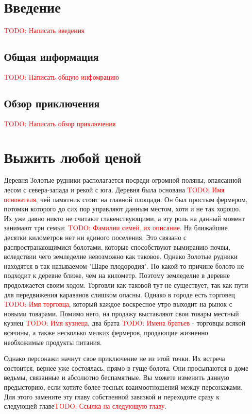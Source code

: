 \documentclass[10pt,a4paper]{book}
\newcommand{\TODO}[1]{\textcolor{red}{TODO: #1}}
\begin{document}
	\chapter{Введение}
		\TODO{Написать введения}
		\section{Общая информация}
			\TODO{Написать общую инфомрацию}
		\section{Обзор приключения}
			\TODO{Написать обзор приключения}
	
	\chapter{Выжить любой ценой}
		Деревня Золотые рудники располагается посреди огромной поляны, опаясанной лесом с севера-запада и рекой с юга. Деревня была основана \TODO{Имя основателя}, чей памятник стоит на главной площади. Он был простым фермером, потомки которого до сих пор управляют данным местом, хотя и не так хорошо. Их уже давно никто не считают главенствующими, а эту роль на данный момент занимают три семьи: \TODO{Фамилии семей, их описание}. На ближайшие десятки километров нет ни единого поселения. Это связано с распространающимися болотами, которые способствуют вымиранию почвы, вследствии чего земледелие невозможно как таковое. Однако Золотые рудники находятся в так называемом "Шаре плодородия". По какой-то причине болото не подходит к деревне ближе, чем на километр. Поэтому земледелие в деревне продолжается своим ходом. Торговли как таковой тут не существует, так как пути для передвижения караванов слишком опасны. Однако в городе есть торговец \TODO{Имя торговца}, который каждое воскресное утро выходит на рынок с новыми товарами. Помимо него, на продажу выставляют свои товары местный кузнец \TODO{Имя кузнеца}, два брата \TODO{Имена братьев} - торговцы всякой всячины, а также несколько мелких фермеров, продающие жизненно необхожимые продукты питания.

		Однако персонажи начнут свое приключение не из этой точки. Их встреча состоится, вернее уже состоялась, прямо в гуще болота. Они просыпаются в доме ведьмы, связанные и абсолютно беспамятные. Вы можете изменить данную предысторию, если хотите более тесных взаимоотношений между персонажами. Для этого замените эту главу собственной завязкой и переходите сразу к следующей главе\TODO{Ссылка на следующую главу}.
		
\end{document}
